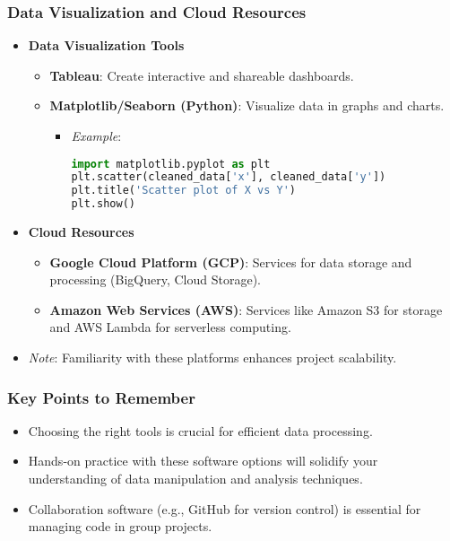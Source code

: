 \documentclass[aspectratio=169]{beamer}
\begin{document}
\begin{frame}[fragile]
    \frametitle{Data Visualization and Cloud Resources}
    \begin{itemize}
        \item \textbf{Data Visualization Tools}
            \begin{itemize}
                \item \textbf{Tableau}: Create interactive and shareable dashboards.
                \item \textbf{Matplotlib/Seaborn (Python)}: Visualize data in graphs and charts.
                    \begin{itemize}
                        \item \textit{Example}:
                        \begin{lstlisting}[language=Python]
import matplotlib.pyplot as plt
plt.scatter(cleaned_data['x'], cleaned_data['y'])
plt.title('Scatter plot of X vs Y')
plt.show()
                        \end{lstlisting}
                    \end{itemize}
            \end{itemize}

        \item \textbf{Cloud Resources}
            \begin{itemize}
                \item \textbf{Google Cloud Platform (GCP)}: Services for data storage and processing (BigQuery, Cloud Storage).
                \item \textbf{Amazon Web Services (AWS)}: Services like Amazon S3 for storage and AWS Lambda for serverless computing.
            \end{itemize}
            \item \textit{Note}: Familiarity with these platforms enhances project scalability.
    \end{itemize}
\end{frame}

\begin{frame}
    \frametitle{Key Points to Remember}
    \begin{itemize}
        \item Choosing the right tools is crucial for efficient data processing.
        \item Hands-on practice with these software options will solidify your understanding of data manipulation and analysis techniques.
        \item Collaboration software (e.g., GitHub for version control) is essential for managing code in group projects.
    \end{itemize}
\end{frame}
\end{document}
